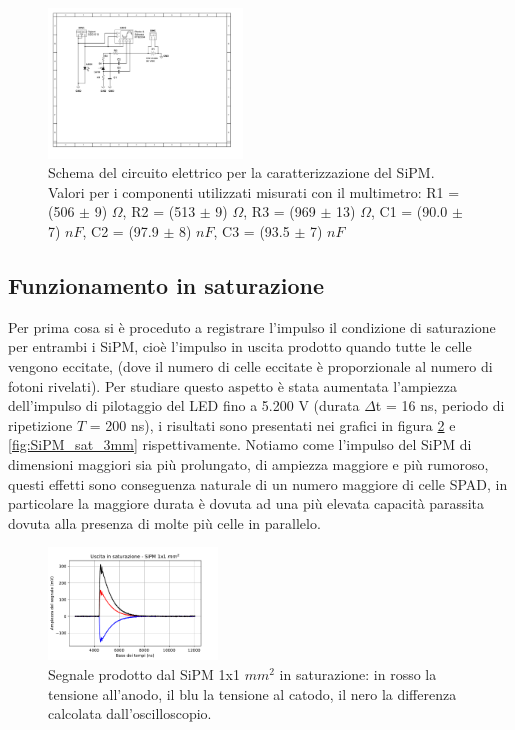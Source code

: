 \documentclass[journal]{IEEEtran}
\begin{document}
\begin{figure}[H]%
\begin{center}
\includegraphics[width=0.46\textwidth]{sch-simulations/output/SiPM.pdf}
\caption{Schema del circuito elettrico per la caratterizzazione del SiPM. Valori per i componenti utilizzati misurati con il multimetro: R1 = (506 $\pm$ 9) $\Omega$, R2 = (513 $\pm$ 9) $\Omega$, R3 = (969 $\pm$ 13) $\Omega$, C1 = (90.0 $\pm$ 7) $nF$, C2 = (97.9 $\pm$ 8) $nF$, C3 = (93.5 $\pm$ 7) $nF$}
\label{fig:oscilloscope}
\end{center}
\end{figure}

\subsection{Funzionamento in saturazione}
Per prima cosa si è proceduto a registrare l'impulso il condizione di saturazione per entrambi i SiPM, cioè l'impulso in uscita prodotto quando tutte le celle vengono eccitate, (dove il numero di celle eccitate è proporzionale al numero di fotoni rivelati). Per studiare questo aspetto è stata aumentata l'ampiezza dell'impulso di pilotaggio del LED fino a 5.200 V (durata $\Delta$t = 16 ns, periodo di ripetizione $T$ = 200 ns), i risultati sono presentati nei grafici in figura \ref{fig:SiPM_sat_1mm} e \ref{fig:SiPM_sat_3mm} rispettivamente. Notiamo come l'impulso del SiPM di dimensioni maggiori sia più prolungato, di ampiezza maggiore e più rumoroso, questi effetti sono conseguenza naturale di un numero maggiore di celle SPAD, in particolare la maggiore durata è dovuta ad una più elevata capacità parassita dovuta alla presenza di molte più celle in parallelo.


\begin{figure}[H]%
\begin{center}
\includegraphics[width=0.40\textwidth]{analysis/output/SiPM_sat_1mm.pdf}
\caption{Segnale prodotto dal SiPM 1x1 $mm^2$ in saturazione: in rosso la tensione all'anodo, il blu la tensione al catodo, il nero la differenza calcolata dall'oscilloscopio.}
\label{fig:SiPM_sat_1mm}
\end{center}
\end{figure}
\end{document}
